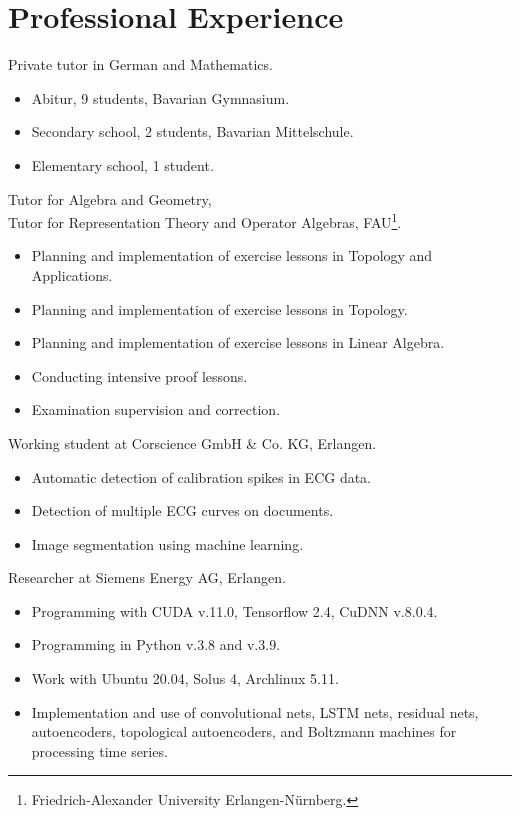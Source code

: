 \documentclass[a4paper, 12pt]{article}
\newcommand{\years}[1]{\marginnote{\scriptsize #1}}
\begin{document}
	\section*{Professional Experience}
	\years{2024--25} Private tutor in German and Mathematics.
	\begin{itemize}
		\item Abitur, 9 students, Bavarian Gymnasium.
		\item Secondary school, 2 students, Bavarian Mittelschule.
		\item Elementary school, 1 student.
	\end{itemize}
	\years{2023--24} Tutor for Algebra and Geometry, \\ Tutor for Representation Theory and Operator Algebras, FAU\footnote{Friedrich-Alexander University Erlangen-Nürnberg.}.
	\begin{itemize}
		\item Planning and implementation of exercise lessons in \glqq Topology and Applications\grqq.
		\item Planning and implementation of exercise lessons in \glqq Topology\grqq.
		\item Planning and implementation of exercise lessons in \glqq Linear Algebra\grqq.
		\item Conducting intensive proof lessons.
		\item Examination supervision and correction.
	\end{itemize}
	\years{2021--22} Working student at Corscience GmbH \& Co. KG, Erlangen.
	\begin{itemize}
		\item Automatic detection of calibration spikes in ECG data.
		\item Detection of multiple ECG curves on documents.
		\item Image segmentation using machine learning.
	\end{itemize}
	\years{2019--21} Researcher at Siemens Energy AG, Erlangen.
	\begin{itemize}
		\item Programming with CUDA v.11.0, Tensorflow 2.4, CuDNN v.8.0.4.
		\item Programming in Python v.3.8 and v.3.9.
		\item Work with Ubuntu 20.04, Solus 4, Archlinux 5.11.
		\item Implementation and use of convolutional nets, LSTM nets, residual nets, autoencoders, topological autoencoders, and Boltzmann machines for processing time series.
	\end{itemize}
\end{document}
